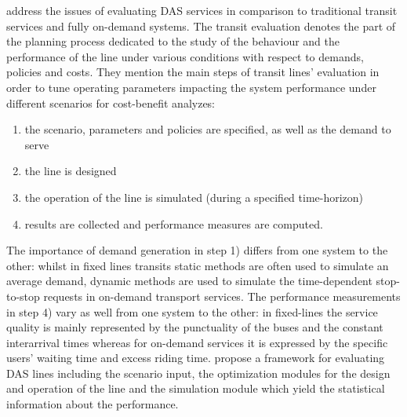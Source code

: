 \documentclass[12pt,a4paper]{article}
\begin{document}
\cite{evaluation} address the issues of evaluating DAS services in comparison to traditional transit services and fully on-demand systems. The transit evaluation denotes the part of the planning process dedicated to the study of the behaviour and the performance of the line under various conditions with respect to demands, policies and costs. They mention the main steps of transit lines' evaluation in order to tune operating parameters impacting the system performance under different scenarios for cost-benefit analyzes: 
\begin{enumerate}
\setlength\itemsep{1pt}
\item the scenario, parameters and policies are specified, as well as the demand to serve
\item the line is designed
\item the operation of the line is simulated (during a specified time-horizon)
\item results are collected and performance measures are computed. 
\end{enumerate}
The importance of demand generation in step 1) differs from one system to the other: whilst in fixed lines transits static methods are often used to simulate an average demand, dynamic methods are used to simulate the time-dependent stop-to-stop requests in on-demand transport services. The performance measurements in step 4) vary as well from one system to the other: in fixed-lines the service quality is mainly represented by the punctuality of the buses and the constant interarrival times whereas for on-demand services it is expressed by the specific users' waiting time and excess riding time. \cite{evaluation} propose a framework for evaluating DAS lines including the scenario input, the optimization modules for the design and operation of the line and the simulation module which yield the statistical information about the performance.
\end{document}
